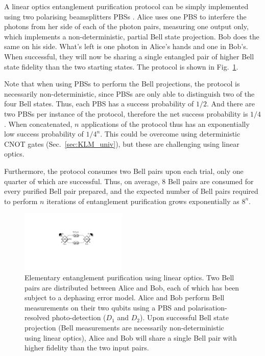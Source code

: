 A linear optics entanglement purification protocol can be simply implemented using two polarising beamsplitters PBSs \cite{bib:Pan01, bib:Pan03}. Alice uses one PBS to interfere the photons from her side of each of the photon pairs, measuring one output only, which implements a non-deterministic, partial Bell state projection. Bob does the same on his side. What's left is one photon in Alice's hands and one in Bob's. When successful, they will now be sharing a single entangled pair of higher Bell state fidelity than the two starting states. The protocol is shown in Fig.~\ref{fig:ent_purif_prot}.

Note that when using PBSs to perform the Bell projections, the protocol is necessarily non-deterministic, since PBSs are only able to distinguish two of the four Bell states. Thus, each PBS has a success probability of $1/2$. And there are two PBSs per instance of the protocol, therefore the net success probability is $1/4$. When concatenated, $n$ applications of the protocol thus has an exponentially low success probability of $1/4^n$. This could be overcome using deterministic CNOT gates (Sec.~\ref{sec:KLM_univ}), but these are challenging using linear optics.

Furthermore, the protocol consumes two Bell pairs upon each trial, only one quarter of which are successful. Thus, on average, 8 Bell pairs are consumed for every purified Bell pair prepared, and the expected number of Bell pairs required to perform $n$ iterations of entanglement purification grows exponentially as $8^n$.

\begin{figure}[htpb]
\includegraphics[width=0.45\textwidth]{ent_purif_prot}
\caption{Elementary entanglement purification using linear optics. Two Bell pairs are distributed between Alice and Bob, each of which has been subject to a dephasing error model. Alice and Bob perform Bell measurements on their two qubits using a PBS and polarisation-resolved photo-detection ($D_1$ and $D_2$). Upon successful Bell state projection (Bell measurements are necessarily non-deterministic using linear optics), Alice and Bob will share a single Bell pair with higher fidelity than the two input pairs.} \label{fig:ent_purif_prot}
\end{figure}

